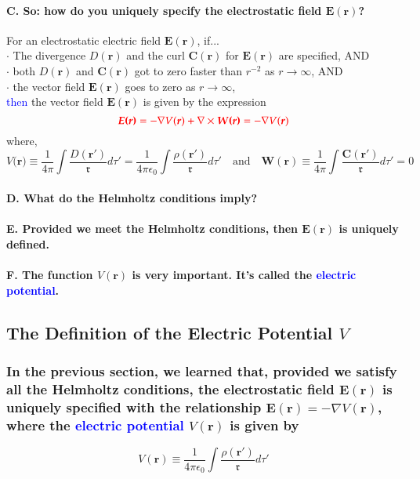 \documentclass{article}
\begin{document}
\paragraph{C. So: how do you uniquely specify the electrostatic field $\boldsymbol{E(r)}$?}
For an electrostatic electric field $\boldsymbol{E(r)}$, if...\\
$\cdot$ The divergence $D(\boldsymbol{r})$ and the curl $\boldsymbol{C(r)}$ for $\boldsymbol{E(r)}$ are specified, AND\\
$\cdot$ both $D(\boldsymbol{r})$ and $\boldsymbol{C(r)}$ got to zero faster than $r^{-2}$ as $r\rightarrow \infty$, AND\\
$\cdot$ the vector field $\boldsymbol{E(r)}$ goes to zero as $r\rightarrow \infty$,\\
\textcolor{blue}{then} the vector field $\boldsymbol{E(r)}$ is given by the expression
\begin{equation*}
    \textcolor{red}{\boldsymbol{E(r)}=-\nabla V(\boldsymbol{r}) +\nabla \times \boldsymbol{W(r)}=-\nabla V(\boldsymbol{r})}
\end{equation*}
\indent where, 
\begin{equation*}
    V(\boldsymbol{r)}\equiv \frac{1}{4\pi}\int\frac{D(\boldsymbol{r'})}{\mathfrak{r}}d\tau'=\frac{1}{4\pi\epsilon_0}\int\frac{\rho (\boldsymbol{r'})}{\mathfrak{r}}d\tau'\quad\text{and} \quad\boldsymbol{W(r)}\equiv \frac{1}{4\pi}\int\frac{\boldsymbol{C(r')}}{\mathfrak{r}}d\tau'=0
\end{equation*}
\paragraph{D. What do the Helmholtz conditions imply?}
\paragraph{E. Provided we meet the Helmholtz conditions, then $\boldsymbol{E(r)}$ is uniquely defined.}
\paragraph{F. The function $V(\boldsymbol{r})$ is very important. It's called the \textcolor{blue}{electric potential}.}
\subsection{The Definition of the Electric Potential $V$}
\subsubsection{In the previous section, we learned that, provided we satisfy all the Helmholtz conditions, the \textbf{electrostatic} field $\boldsymbol{E(r)}$ is uniquely specified with the relationship $\boldsymbol{E(r)}=-\nabla V(\boldsymbol{r})$, where the \textcolor{blue}{electric potential} $V(\boldsymbol{r})$ is given by}
\begin{equation*}
    V(\boldsymbol{r})\equiv \frac{1}{4\pi\epsilon_0}\int\frac{\rho(\boldsymbol{r'})}{\mathfrak{r}}d\tau'
\end{equation*}
\end{document}
